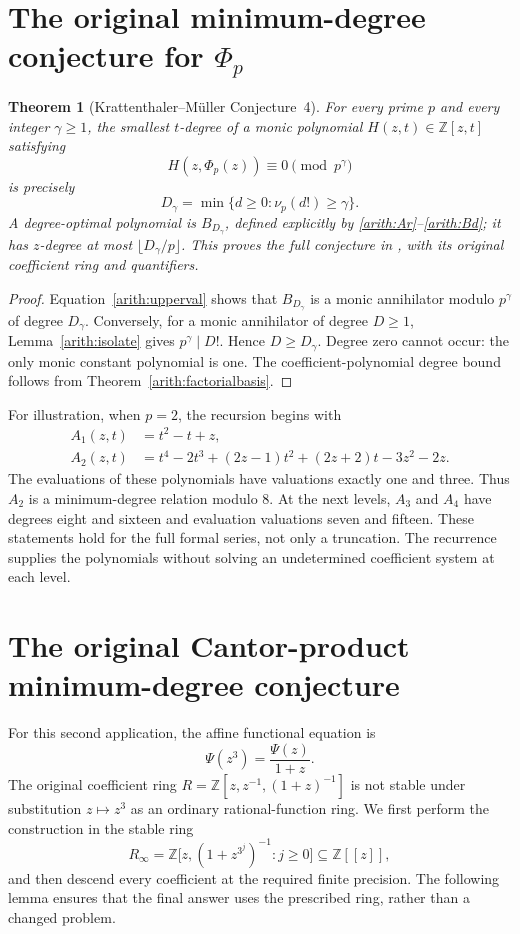 \documentclass[11pt,a4paper]{article}
\newtheorem{theorem}{Theorem}
\theoremstyle{definition}
\theoremstyle{remark}\newtheorem{remark}[lemma]{Remark}
\begin{document}
\section{The original minimum-degree conjecture for \texorpdfstring{$\Phi_p$}{Phi p}}

\begin{theorem}[Krattenthaler--M\"uller Conjecture~4]
\label{arith:phiconjecture}
For every prime $p$ and every integer $\gamma\geq1$, the smallest
$t$-degree of a monic polynomial $H(z,t)\in\mathbb Z[z,t]$ satisfying
\[
 H(z,\Phi_p(z))\equiv0\pmod{p^\gamma}
\]
is precisely
\[
 D_\gamma=\min\{d\geq0:\nu_p(d!)\geq\gamma\}.
\]
A degree-optimal polynomial is $B_{D_\gamma}$, defined explicitly by
\eqref{arith:Ar}--\eqref{arith:Bd}; it has
$z$-degree at most $\lfloor D_\gamma/p\rfloor$.
This proves the full conjecture in \cite{KMp}, with its original
coefficient ring and quantifiers.
\end{theorem}
\begin{proof}
Equation~\eqref{arith:upperval} shows that $B_{D_\gamma}$ is a monic
annihilator modulo $p^\gamma$ of degree $D_\gamma$. Conversely, for a
monic annihilator of degree $D\geq1$, Lemma~\ref{arith:isolate} gives
$p^\gamma\mid D!$. Hence $D\geq D_\gamma$. Degree zero cannot occur:
the only monic constant polynomial is one. The coefficient-polynomial degree bound follows
from Theorem~\ref{arith:factorialbasis}.
\end{proof}

For illustration, when $p=2$, the recursion begins with
\begin{align*}
 A_1(z,t)&=t^2-t+z,\\
 A_2(z,t)&=t^4-2t^3+(2z-1)t^2+(2z+2)t-3z^2-2z.
\end{align*}
The evaluations of these polynomials have valuations exactly one and
three. Thus $A_2$ is a minimum-degree relation modulo $8$. At the next
levels, $A_3$ and $A_4$ have degrees eight and sixteen and evaluation
valuations seven and fifteen. These statements hold for the full formal
series, not only a truncation. The recurrence supplies the polynomials
without solving an undetermined coefficient system at each level.

\section{The original Cantor-product minimum-degree conjecture}

For this second application, the affine functional equation is
\begin{equation}\label{arith:psifunctional}
 \Psi(z^3)=\frac{\Psi(z)}{1+z}.
\end{equation}
The original coefficient ring
$R=\mathbb Z[z,z^{-1},(1+z)^{-1}]$ is not stable under substitution
$z\mapsto z^3$ as an ordinary rational-function ring. We first perform
the construction in the stable ring
\[
 R_\infty=\mathbb Z\bigl[z,(1+z^{3^j})^{-1}:j\geq0\bigr]
       \subseteq\mathbb Z[[z]],
\]
and then descend every coefficient at the required finite precision.
The following lemma ensures that the final answer uses the prescribed
ring, rather than a changed problem.
\end{document}
